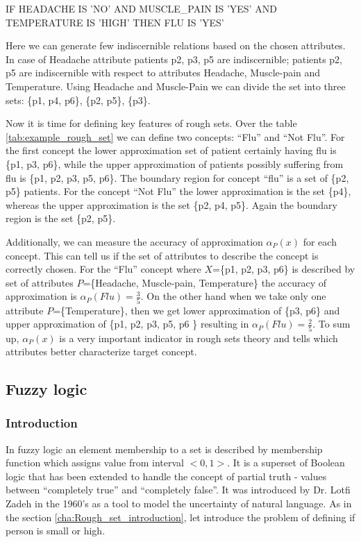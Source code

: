 IF HEADACHE IS 'NO' AND MUSCLE\_PAIN IS 'YES' AND TEMPERATURE IS 'HIGH' THEN FLU IS 'YES'

Here we can generate few indiscernible relations based on 
the chosen attributes. In case of Headache attribute patients p2, p3, p5 are indiscernible; patients p2, p5 are
indiscernible with respect to attributes Headache, Muscle-pain and Temperature. 
Using Headache and Muscle-Pain we can divide the set into three sets:
\{p1, p4, p6\}, \{p2, p5\}, \{p3\}.

Now it is time for defining key features of rough sets. Over the table
\ref{tab:example_rough_set} we can define two concepts: ``Flu'' and
``Not Flu''. For the first concept the lower approximation
set of patient certainly having flu is \{p1, p3, p6\}, while the upper
approximation of patients possibly suffering from flu is \{p1, p2, p3, p5,
p6\}. The boundary region for concept ``flu'' is a set of \{p2, p5\} patients. 
For the concept ``Not Flu'' the lower approximation is the set \{p4\}, whereas
the upper approximation is the set \{p2, p4, p5\}. Again the boundary region is
the set \{p2, p5\}.

Additionally, we can measure the accuracy of approximation $\alpha_P(x)$ for each concept.
This can tell us if the set of attributes to describe the concept is correctly
chosen. For the ``Flu'' concept where $X$=\{p1, p2, p3, p6\} is described by
set of attributes $P$=\{Headache, Muscle-pain, Temperature\} the accuracy of
approximation is $\alpha_P(Flu) = \frac{3}{5}$. On the other hand when we take
only one attribute $P$=\{Temperature\}, then we get lower approximation of \{p3,
p6\} and upper approximation of \{p1, p2, p3, p5, p6 \} resulting in
$\alpha_P(Flu) = \frac{2}{5}$. To sum up, $\alpha_P(x)$ is a very important indicator in
rough sets theory and tells which attributes better characterize target
concept. 


\subsection{Fuzzy logic}
\label{cha:Fuzzy_logic}
\subsubsection{Introduction}
In fuzzy logic an element membership to a set is described by membership function 
which assigns value from interval $<0, 1>$. It is a superset of Boolean logic that 
has been extended to handle the concept of partial truth - values between ``completely 
true'' and ``completely false''. It was introduced by Dr. Lotfi Zadeh in the
1960's as a tool to model the uncertainty of natural language. As in the
section \ref{cha:Rough_set_introduction}, let introduce the problem of defining 
if person is small or high. 

